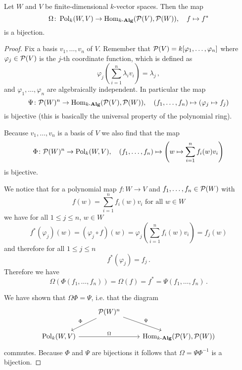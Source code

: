 \begin{proposition}
  Let $W$ and $V$ be finite-dimensional $k$-vector spaces.
  Then the map
  \[
            \Omega
    \colon  \operatorname{Pol}_k(W,V)
    \to     \operatorname{Hom}_{k\text{-}\mathbf{Alg}}(\mathcal{P}(V), \mathcal{P}(W)),
    \quad   f
    \mapsto f^*
  \]
  is a bijection.
\end{proposition}
\begin{proof}
  Fix a basis $v_1, \dotsc, v_n$ of $V$.
  Remember that $\mathcal{P}(V) = k[\varphi_1, \dotsc, \varphi_n]$ where $\varphi_j \in \mathcal{P}(V)$ is the $j$-th coordinate function, which is defined as
  \[
      \varphi_j\left( \sum_{i=1}^n \lambda_i v_i \right)
    = \lambda_j \,,
\]
  and $\varphi_1, \dotsc, \varphi_n$ are algebraically independent.
  In particular the map
  \[
            \Psi
    \colon  \mathcal{P}(W)^n
    \to     \operatorname{Hom}_{k\text{-}\mathbf{Alg}}(\mathcal{P}(V),\mathcal{P}(W)),
    \quad   (f_1, \dotsc, f_n)
    \mapsto (\varphi_j \mapsto f_j)
  \]
  is bijective (this is basically the universal property of the polynomial ring).
  
  Because $v_1, \dotsc, v_n$ is a basis of $V$ we also find that the map
  \[
            \Phi
    \colon  \mathcal{P}(W)^n
    \to     \operatorname{Pol}_k(W,V),
    \quad   (f_1, \dotsc, f_n)
    \mapsto \left(
                      w
              \mapsto \sum_{i=1}^n f_i(w)v_i
            \right)
  \]
  is bijective.
  
  We notice that for a polynomial map $f \colon W \to V$ and $f_1, \dotsc, f_n \in \mathcal{P}(W)$ with
  \[
      f(w)
    = \sum_{i=1}^n f_i(w) v_i
    \text{ for all }
    w \in W
  \]
  we have for all $1 \leq j \leq n$, $w \in W$
  \[
      f^*(\varphi_j)(w)
    = (\varphi_j \circ f)(w)
    = \varphi_j\left( \sum_{i=1}^n f_i(w) v_i \right)
    = f_j(w)
  \]
  and therefore for all $1 \leq j \leq n$
  \[
      f^*(\varphi_j)
    = f_j \,.
  \]
  Therefore we have
  \[
      \Omega(\Phi(f_1, \dotsc, f_n))
    = \Omega(f)
    = f^*
    = \Psi(f_1, \dotsc, f_n) \,.
  \]
  
  We have shown that $\Omega \Phi = \Psi$, i.e. that the diagram
  \[
    \begin{tikzcd}
        {}
      & \mc{P}(W)^n
        \arrow[swap]{dl}{\Phi}
        \arrow{dr}{\Psi}
      & {}
      \\
        \Pol_k(W,V)
        \arrow{rr}{\Omega}
      & {}
      & \Hom_{\cAlg{k}}(\mc{P}(V),\mc{P}(W))
    \end{tikzcd}
  \]
  commutes.
  Because $\Phi$ and $\Psi$ are bijections it follows that $\Omega = \Psi \Phi^{-1}$ is a bijection.
\end{proof}

